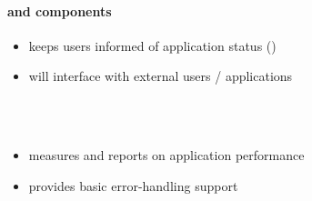 \begin{frame}[fragile] 
\secframetitle{\ssComponents}
\framesubtitle{ and  components}

\begin{itemize}
\item {} keeps users informed of application status ()
\item {} will interface with external users / applications
\end{itemize}
\ \\
\ \\

\begin{itemize}
\item {} measures and reports on application performance
\item {} provides basic error-handling support
\end{itemize}
\end{frame}




